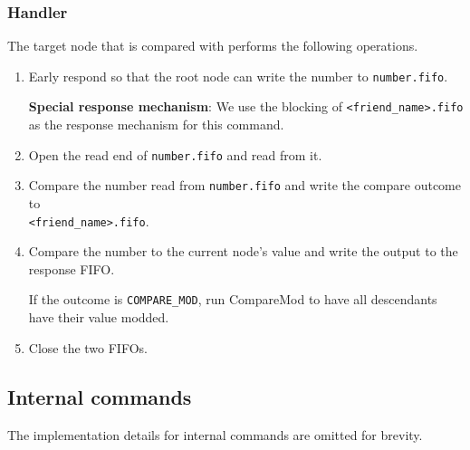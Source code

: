 \documentclass[12pt, a4paper]{article}
\begin{document}
  \subsubsection{Handler}
  The target node that is compared with performs the following operations.
  \begin{enumerate}
    \item Early respond so that the root node can write the number to \verb|number.fifo|.

    \textbf{Special response mechanism}: We use the blocking of
    \verb|<friend_name>.fifo| as the response mechanism for this command.
    \item Open the read end of \verb|number.fifo| and read from it.
    \item Compare the number read from \verb|number.fifo| and write the
    compare outcome to\\
    \verb|<friend_name>.fifo|.
    \item Compare the number to the current node's value and write the output
    to the response FIFO.
    \par If the outcome is \verb|COMPARE_MOD|, run CompareMod to have all
    descendants have their value modded.
    \item Close the two FIFOs.
  \end{enumerate}

  \subsection{Internal commands}
  The implementation details for internal commands are omitted for brevity.
\end{document}
